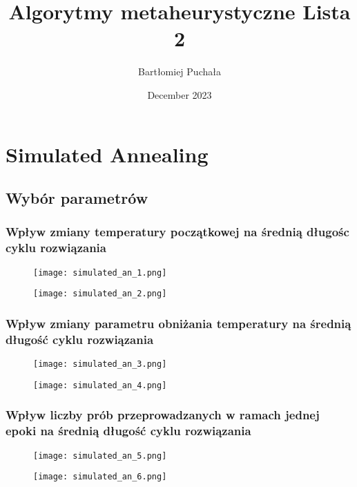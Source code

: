 \documentclass{article}
\title{Algorytmy metaheurystyczne Lista 2}
\author{Bartłomiej Puchała}
\date{December 2023}
\begin{document}
\maketitle

\section{Simulated Annealing}
\subsection{Wybór parametrów}
\subsubsection{Wpływ zmiany temperatury początkowej na średnią długośc cyklu rozwiązania}
    \begin{figure}[h!]
        \centering
        \texttt{[image: simulated\_an\_1.png]}
    \end{figure}

    \begin{figure}[h!]
        \centering
        \texttt{[image: simulated\_an\_2.png]}
    \end{figure}

\newpage

\subsubsection{Wpływ zmiany parametru obniżania temperatury na średnią długość cyklu rozwiązania}
    \begin{figure}[h!]
        \centering
        \texttt{[image: simulated\_an\_3.png]}
    \end{figure}
        \begin{figure}[h!]
        \centering
        \texttt{[image: simulated\_an\_4.png]}
    \end{figure}

\newpage

\subsubsection{Wpływ liczby prób przeprowadzanych w ramach jednej epoki na średnią długość cyklu rozwiązania}
    \begin{figure}[h!]
        \centering
        \texttt{[image: simulated\_an\_5.png]}
    \end{figure}
        \begin{figure}[h!]
        \centering
        \texttt{[image: simulated\_an\_6.png]}
    \end{figure}
    
\end{document}
